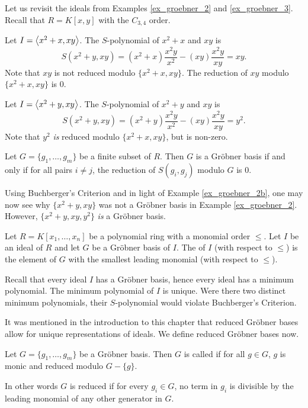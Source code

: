 Let us revisit the ideals from Examples \ref{ex_groebner_2} and \ref{ex_groebner_3}.
Recall that $R = K[x,y]$ with the $C_{3,4}$ order.
\begin{example}
  \label{ex_groebner_2b}
  Let $I = \left\langle x^2 + x, xy \right\rangle$.
  The $S$-polynomial of $x^2 + x$ and $xy$ is
  \[ S(x^2 + y, xy) = (x^2 + x) \frac{x^2y}{x^2} - (xy)\frac{x^2y}{xy} = xy. \]
  Note that $xy$ is not reduced modulo $\{x^2 + x, xy\}$.
  The reduction of $xy$ modulo $\{x^2 + x, xy\}$ is 0.
\end{example}
\begin{example}
  \label{ex_groebner_3b}
  Let $I = \left\langle x^2 + y, xy \right\rangle$.
  The $S$-polynomial of $x^2 + y$ and $xy$ is
  \[ S(x^2 + y, xy) = (x^2 + y) \frac{x^2y}{x^2} - (xy)\frac{x^2y}{xy} = y^2. \]
  Note that $y^2$ \emph{is} reduced modulo $\{x^2 + x, xy\}$, but is non-zero.
\end{example}

\begin{theorem}
  Let $G = \{g_1, \ldots, g_m\}$ be a finite subset of $R$.
  Then $G$ is a Gr\"obner basis if and only if for all pairs $i \neq j$,
  the reduction of $S(g_i, g_j)$ modulo $G$ is $0$.
\end{theorem}

Using Buchberger's Criterion and in light of Example \ref{ex_groebner_2b},
one may now see why $\{x^2 + y, xy\}$ was not a Gr\"obner basis in Example \ref{ex_groebner_2}.
However, $\{x^2 + y, xy, y^2\}$ \emph{is} a Gr\"obner basis.

\begin{definition}
  \label{def_minimum_polynomial}
  Let $R = K[x_1, \ldots, x_n]$ be a polynomial ring with a monomial order $\leq$.
  Let $I$ be an ideal of $R$ and let $G$ be a Gr\"obner basis of $I$.
  The  of $I$ (with respect to $\leq$)
  is the element of $G$ with the smallest leading monomial (with respect to $\leq$).
\end{definition}
Recall that every ideal $I$ has a Gr\"obner basis, hence every ideal has a minimum polynomial.
The minimum polynomial of $I$ is unique.
Were there two distinct minimum polynomials, their $S$-polynomial would violate Buchberger's Criterion.

It was mentioned in the introduction to this chapter
that reduced Gr\"obner bases allow for unique representations of ideals.
We define reduced Gr\"obner bases now.
\begin{definition}
  \label{def_reduced_groebner_basis}
  Let $G = \{g_1, \ldots, g_m\}$ be a Gr\"obner basis.
  Then $G$ is called  if for all $g \in G$, $g$ is monic and reduced modulo $G-\{g\}$.
\end{definition}
In other words $G$ is reduced if for every $g_i \in G$,
no term in $g_i$ is divisible by the leading monomial of any other generator in $G$.

